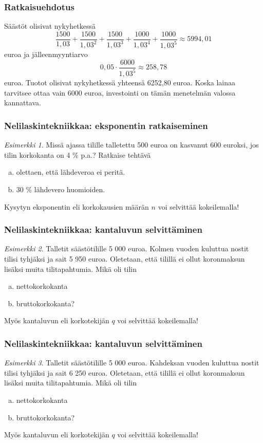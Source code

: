\documentclass{article}\usepackage[]{graphicx}\usepackage[]{color}
\theoremstyle{remark}
\newtheorem{esim}{Esimerkki}
\begin{document}
\begin{frame}
  \frametitle{Ratkaisuehdotus}
        Säästöt olisivat nykyhetkessä
        \[
            \frac{1500}{1,03} + \frac{1500}{1,03^2} + \frac{1500}{1,03^3} + \frac{1000}{1,03^4} + \frac{1000}{1,03^5}\approx 5994,01
       \]
       euroa ja jälleenmyyntiarvo
       \[
            0,05\cdot\frac{6000}{1,03^5}\approx 258,78
       \]
       euroa. Tuotot olisivat nykyhetkessä yhteensä 6252,80 euroa. Koska lainaa tarvitsee ottaa vain 6000 euroa,
       investointi on tämän menetelmän valossa kannattava.
\end{frame}

\begin{frame}
    \frametitle{Nelilaskintekniikkaa: eksponentin ratkaiseminen}
    \pause
    \begin{esim}
        Missä ajassa tilille talletettu 500 euroa on kasvanut 600 euroksi, jos tilin korkokanta on 4 \% p.a.?
        Ratkaise tehtävä
        \begin{enumerate}[(a)]
            \item olettaen, että lähdeveroa ei peritä.
            \item 30 \% lähdevero huomioiden.
        \end{enumerate}
    \end{esim}
    \pause
    Kysytyn eksponentin  eli korkokausien määrän $n$ voi selvittää kokeilemalla!
\end{frame}

\begin{frame}
    \frametitle{Nelilaskintekniikkaa: kantaluvun selvittäminen}
    \begin{esim}
        Talletit säästötilille 5 000 euroa. Kolmen vuoden kuluttua nostit tilisi tyhjäksi ja sait 5 950 euroa.
        Oletetaan, että tilillä ei ollut koronmaksun lisäksi muita tilitapahtumia. Mikä oli tilin
        \begin{enumerate}[(a)]
            \item nettokorkokanta
            \item bruttokorkokanta?
        \end{enumerate}
    \end{esim}
    \pause
    Myös kantaluvun eli korkotekijän $q$ voi selvittää kokeilemalla!
\end{frame}

\begin{frame}
    \frametitle{Nelilaskintekniikkaa: kantaluvun selvittäminen}
    \begin{esim}
        Talletit säästötilille 5 000 euroa. Kahdeksan vuoden kuluttua nostit tilisi tyhjäksi ja sait 6 250 euroa.
        Oletetaan, että tilillä ei ollut koronmaksun lisäksi muita tilitapahtumia. Mikä oli tilin
        \begin{enumerate}[(a)]
            \item nettokorkokanta
            \item bruttokorkokanta?
        \end{enumerate}
    \end{esim}
    \pause
    Myös kantaluvun eli korkotekijän $q$ voi selvittää kokeilemalla!
\end{frame}
\end{document}
